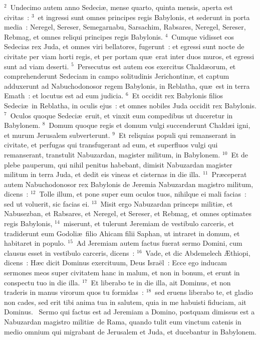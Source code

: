 ${}^{2}$~Undecimo autem anno Sedeci\ae , mense quarto, quinta mensis, aperta est civitas~:
${}^{3}$~et ingressi sunt omnes principes regis Babylonis, et sederunt in porta media~: Neregel, Sereser, Semegarnabu, Sarsachim, Rabsares, Neregel, Sereser, Rebmag, et omnes reliqui principes regis Babylonis.
${}^{4}$~Cumque vidisset eos Sedecias rex Juda, et omnes viri bellatores, fugerunt~: et egressi sunt nocte de civitate per viam horti regis, et per portam qu\ae\ erat inter duos muros, et egressi sunt ad viam deserti.
${}^{5}$~Persecutus est autem eos exercitus Chald\ae orum, et comprehenderunt Sedeciam in campo solitudinis Jerichontin\ae , et captum adduxerunt ad Nabuchodonosor regem Babylonis, in Reblatha, qu\ae\ est in terra Emath~: et locutus est ad eum judicia.
${}^{6}$~Et occidit rex Babylonis filios Sedeci\ae\ in Reblatha, in oculis ejus~: et omnes nobiles Juda occidit rex Babylonis.
${}^{7}$~Oculos quoque Sedeci\ae\ eruit, et vinxit eum compedibus ut duceretur in Babylonem.
${}^{8}$~Domum quoque regis et domum vulgi succenderunt Chald\ae i igni, et murum Jerusalem subverterunt.
${}^{9}$~Et reliquias populi qui remanserant in civitate, et perfugas qui transfugerant ad eum, et superfluos vulgi qui remanserant, transtulit Nabuzardan, magister militum, in Babylonem.
${}^{10}$~Et de plebe pauperum, qui nihil penitus habebant, dimisit Nabuzardan magister militum in terra Juda, et dedit eis vineas et cisternas in die illa.
${}^{11}$~Pr\ae ceperat autem Nabuchodonosor rex Babylonis de Jeremia Nabuzardan magistro militum, dicens~:
${}^{12}$~Tolle illum, et pone super eum oculos tuos, nihilque ei mali facias~: sed ut voluerit, sic facias ei.
${}^{13}$~Misit ergo Nabuzardan princeps militi\ae , et Nabusezban, et Rabsares, et Neregel, et Sereser, et Rebmag, et omnes optimates regis Babylonis,
${}^{14}$~miserunt, et tulerunt Jeremiam de vestibulo carceris, et tradiderunt eum Godoli\ae\ filio Ahicam filii Saphan, ut intraret in domum, et habitaret in populo.
${}^{15}$~Ad Jeremiam autem factus fuerat sermo Domini, cum clausus esset in vestibulo carceris, dicens~:
${}^{16}$~Vade, et dic Abdemelech \AE thiopi, dicens~: H\ae c dicit Dominus exercituum, Deus Isra\"el~: Ecce ego inducam sermones meos super civitatem hanc in malum, et non in bonum, et erunt in conspectu tuo in die illa.
${}^{17}$~Et liberabo te in die illa, ait Dominus, et non traderis in manus virorum quos tu formidas~:
${}^{18}$~sed eruens liberabo te, et gladio non cades, sed erit tibi anima tua in salutem, quia in me habuisti fiduciam, ait Dominus.
~\lettrine[lines=10,image=true,loversize=0.05,lraise=-0.03]{S}{}ermo qui factus est ad Jeremiam a Domino, postquam dimissus est a Nabuzardan magistro militi\ae\ de Rama, quando tulit eum vinctum catenis in medio omnium qui migrabant de Jerusalem et Juda, et ducebantur in Babylonem.
